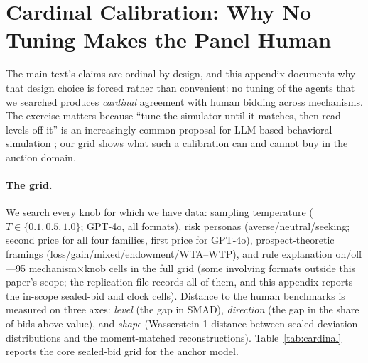 \section{Cardinal Calibration: Why No Tuning Makes the Panel Human}\label{app:cardinal}

The main text's claims are ordinal by design, and this appendix documents why that design choice is forced rather than convenient: no tuning of the agents that we searched produces \emph{cardinal} agreement with human bidding across mechanisms. The exercise matters because ``tune the simulator until it matches, then read levels off it'' is an increasingly common proposal for LLM-based behavioral simulation \citep{corrigan2025usefulness}; our grid shows what such a calibration can and cannot buy in the auction domain.

\paragraph{The grid.}
We search every knob for which we have data: sampling temperature ($T\in\{0.1, 0.5, 1.0\}$; GPT-4o, all formats), risk personas (averse/neutral/seeking; second price for all four families, first price for GPT-4o), prospect-theoretic framings (loss/gain/mixed/endowment/WTA--WTP), and rule explanation on/off---95 mechanism$\times$knob cells in the full grid (some involving formats outside this paper's scope; the replication file  records all of them, and this appendix reports the in-scope sealed-bid and clock cells). Distance to the human benchmarks is measured on three axes: \emph{level} (the gap in SMAD), \emph{direction} (the gap in the share of bids above value), and \emph{shape} (Wasserstein-1 distance between scaled deviation distributions and the moment-matched reconstructions). Table~\ref{tab:cardinal} reports the core sealed-bid grid for the anchor model.

